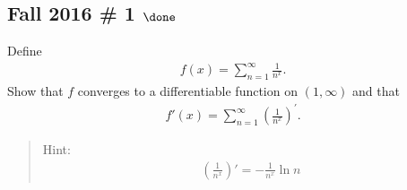 \hypertarget{fall-2016-1-done}{%
\subsection{\texorpdfstring{Fall 2016 \# 1
\(\done\)}{Fall 2016 \# 1 \textbackslash done}}\label{fall-2016-1-done}}

Define
\begin{align*}
f(x) = \sum_{n=1}^{\infty} \frac{1}{n^{x}}.
\end{align*}
Show that \(f\) converges to a differentiable function on
\((1, \infty)\) and that
\begin{align*}
f'(x)  =\sum_{n=1}^{\infty}\left(\frac{1}{n^{x}}\right)^{\prime}.
\end{align*}

\begin{quote}
Hint:
\begin{align*}
\left(\frac{1}{n^{x}}\right)' = -\frac{1}{n^{x}} \ln n
\end{align*}
\end{quote}


